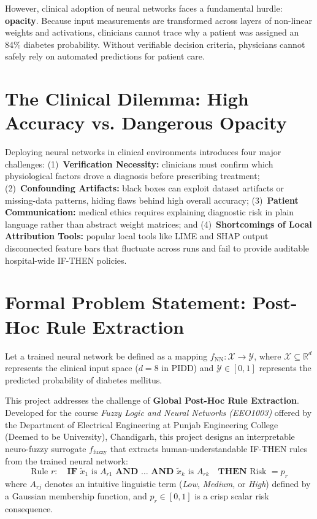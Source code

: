 \documentclass{report}
\begin{document}
However, clinical adoption of neural networks faces a fundamental hurdle: \textbf{opacity}. Because input measurements are transformed across layers of non-linear weights and activations, clinicians cannot trace why a patient was assigned an 84\% diabetes probability. Without verifiable decision criteria, physicians cannot safely rely on automated predictions for patient care.

\section{The Clinical Dilemma: High Accuracy vs. Dangerous Opacity}

Deploying neural networks in clinical environments introduces four major challenges: (1)~\textbf{Verification Necessity:} clinicians must confirm which physiological factors drove a diagnosis before prescribing treatment; (2)~\textbf{Confounding Artifacts:} black boxes can exploit dataset artifacts or missing-data patterns, hiding flaws behind high overall accuracy; (3)~\textbf{Patient Communication:} medical ethics requires explaining diagnostic risk in plain language rather than abstract weight matrices; and (4)~\textbf{Shortcomings of Local Attribution Tools:} popular local tools like LIME and SHAP output disconnected feature bars that fluctuate across runs and fail to provide auditable hospital-wide IF-THEN policies.

\section{Formal Problem Statement: Post-Hoc Rule Extraction}

Let a trained neural network be defined as a mapping $f_{\text{NN}}: \mathcal{X} \to \mathcal{Y}$, where $\mathcal{X} \subseteq \mathbb{R}^d$ represents the clinical input space ($d=8$ in PIDD) and $\mathcal{Y} \in [0, 1]$ represents the predicted probability of diabetes mellitus.

This project addresses the challenge of \textbf{Global Post-Hoc Rule Extraction}. Developed for the course \textit{Fuzzy Logic and Neural Networks (EEO1003)} offered by the Department of Electrical Engineering at Punjab Engineering College (Deemed to be University), Chandigarh, this project designs an interpretable neuro-fuzzy surrogate $f_{\text{fuzzy}}$ that extracts human-understandable IF-THEN rules from the trained neural network:
\begin{equation}
    \text{Rule } r: \quad \textbf{IF } \tilde{x}_1 \text{ is } A_{r1} \textbf{ AND } \dots \textbf{ AND } \tilde{x}_k \text{ is } A_{rk} \quad \textbf{THEN } \text{Risk } = p_r
\end{equation}
where $A_{rj}$ denotes an intuitive linguistic term (\textit{Low}, \textit{Medium}, or \textit{High}) defined by a Gaussian membership function, and $p_r \in [0, 1]$ is a crisp scalar risk consequence.
\end{document}
